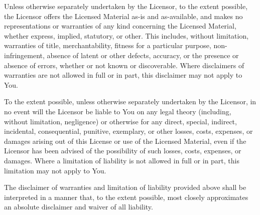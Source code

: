 \documentclass{article}
\begin{document}
\begin{sffamily}
Unless otherwise separately undertaken by the Licensor, to the extent possible, the Licensor offers the Licensed Material as-is and as-available, and makes no representations or warranties of any kind concerning the Licensed Material, whether express, implied, statutory, or other. This includes, without limitation, warranties of title, merchantability, fitness for a particular purpose, non-infringement, absence of latent or other defects, accuracy, or the presence or absence of errors, whether or not known or discoverable. Where disclaimers of warranties are not allowed in full or in part, this disclaimer may not apply to You.

To the extent possible, unless otherwise separately undertaken by the Licensor, in no event will the Licensor be liable to You on any legal theory (including, without limitation, negligence) or otherwise for any direct, special, indirect, incidental, consequential, punitive, exemplary, or other losses, costs, expenses, or damages arising out of this License or use of the Licensed Material, even if the Licensor has been advised of the possibility of such losses, costs, expenses, or damages. Where a limitation of liability is not allowed in full or in part, this limitation may not apply to You.

The disclaimer of warranties and limitation of liability provided above shall be interpreted in a manner that, to the extent possible, most closely approximates an absolute disclaimer and waiver of all liability.

\end{sffamily}
\end{document}
